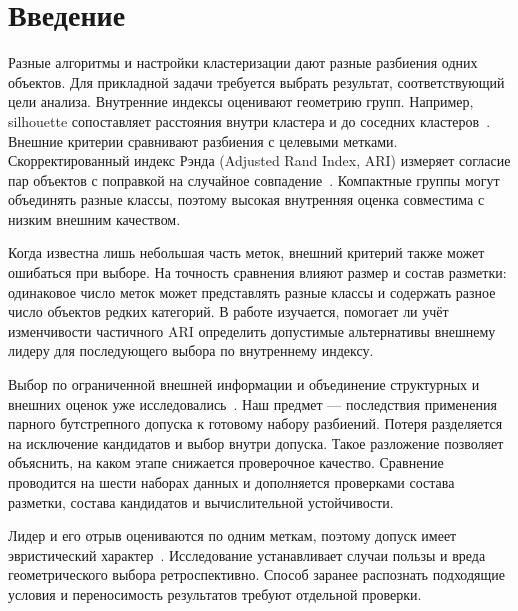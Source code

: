 \section{Введение}\label{sec:intro}
Разные алгоритмы и настройки кластеризации дают разные разбиения одних объектов. Для прикладной задачи требуется выбрать результат, соответствующий цели анализа. Внутренние индексы оценивают геометрию групп. Например, silhouette сопоставляет расстояния внутри кластера и до соседних кластеров~\citep{rousseeuw1987}. Внешние критерии сравнивают разбиения с целевыми метками. Скорректированный индекс Рэнда (Adjusted Rand Index, ARI) измеряет согласие пар объектов с поправкой на случайное совпадение~\citep{hubert1985}. Компактные группы могут объединять разные классы, поэтому высокая внутренняя оценка совместима с низким внешним качеством.

Когда известна лишь небольшая часть меток, внешний критерий также может ошибаться при выборе. На точность сравнения влияют размер и состав разметки: одинаковое число меток может представлять разные классы и содержать разное число объектов редких категорий. В работе изучается, помогает ли учёт изменчивости частичного ARI определить допустимые альтернативы внешнему лидеру для последующего выбора по внутреннему индексу.

Выбор по ограниченной внешней информации и объединение структурных и внешних оценок уже исследовались~\citep{pourrajabi2014,cobs2017,gertrudes2019}. Наш предмет --- последствия применения парного бутстрепного допуска к готовому набору разбиений. Потеря разделяется на исключение кандидатов и выбор внутри допуска. Такое разложение позволяет объяснить, на каком этапе снижается проверочное качество. Сравнение проводится на шести наборах данных и дополняется проверками состава разметки, состава кандидатов и вычислительной устойчивости.

Лидер и его отрыв оцениваются по одним меткам, поэтому допуск имеет эвристический характер~\citep{efron2014}. Исследование устанавливает случаи пользы и вреда геометрического выбора ретроспективно. Способ заранее распознать подходящие условия и переносимость результатов требуют отдельной проверки.
